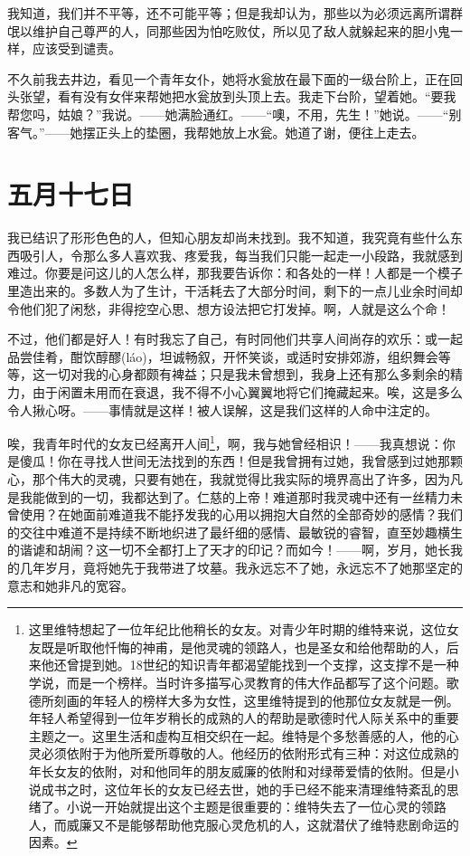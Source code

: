 \documentclass[12pt,oneside]{book}
\begin{document}
我知道，我们并不平等，还不可能平等；但是我却认为，那些以为必须远离所谓群氓以维护自己尊严的人，同那些因为怕吃败仗，所以见了敌人就躲起来的胆小鬼一样，应该受到谴责。

不久前我去井边，看见一个青年女仆，她将水瓮放在最下面的一级台阶上，正在回头张望，看有没有女伴来帮她把水瓮放到头顶上去。我走下台阶，望着她。“要我帮您吗，姑娘？”我说。——她满脸通红。——“噢，不用，先生！”她说。——“别客气。”——她摆正头上的垫圈，我帮她放上水瓮。她道了谢，便往上走去。


\chapter{五月十七日}
我已结识了形形色色的人，但知心朋友却尚未找到。我不知道，我究竟有些什么东西吸引人，令那么多人喜欢我、疼爱我，每当我们只能一起走一小段路，我就感到难过。你要是问这儿的人怎么样，那我要告诉你：和各处的一样！人都是一个模子里造出来的。多数人为了生计，干活耗去了大部分时间，剩下的一点儿业余时间却令他们犯了闲愁，非得挖空心思、想方设法把它打发掉。啊，人就是这么个命！

不过，他们都是好人！有时我忘了自己，有时同他们共享人间尚存的欢乐：或一起品尝佳肴，酣饮醇醪(láo)，坦诚畅叙，开怀笑谈，或适时安排郊游，组织舞会等等，这一切对我的心身都颇有裨益；只是我未曾想到，我身上还有那么多剩余的精力，由于闲置未用而在衰退，我不得不小心翼翼地将它们掩藏起来。唉，这是多么令人揪心呀。——事情就是这样！被人误解，这是我们这样的人命中注定的。

唉，我青年时代的女友已经离开人间\footnote{这里维特想起了一位年纪比他稍长的女友。对青少年时期的维特来说，这位女友既是听取他忏悔的神甫，是他灵魂的领路人，也是圣女和给他帮助的人，后来他还曾提到她。18世纪的知识青年都渴望能找到一个支撑，这支撑不是一种学说，而是一个榜样。当时许多描写心灵教育的伟大作品都写了这个问题。歌德所刻画的年轻人的榜样大多为女性，这里维特提到的他那位女友就是一例。年轻人希望得到一位年岁稍长的成熟的人的帮助是歌德时代人际关系中的重要主题之一。这里生活和虚构互相交织在一起。维特是个多愁善感的人，他的心灵必须依附于为他所爱所尊敬的人。他经历的依附形式有三种：对这位成熟的年长女友的依附，对和他同年的朋友威廉的依附和对绿蒂爱情的依附。但是小说成书之时，这位年长的女友已经去世，她的手已经不能来清理维特紊乱的思绪了。小说一开始就提出这个主题是很重要的：维特失去了一位心灵的领路人，而威廉又不是能够帮助他克服心灵危机的人，这就潜伏了维特悲剧命运的因素。}，啊，我与她曾经相识！——我真想说：你是傻瓜！你在寻找人世间无法找到的东西！但是我曾拥有过她，我曾感到过她那颗心，那个伟大的灵魂，只要有她在，我就觉得比我实际的境界高出了许多，因为凡是我能做到的一切，我都达到了。仁慈的上帝！难道那时我灵魂中还有一丝精力未曾使用？在她面前难道我不能抒发我的心用以拥抱大自然的全部奇妙的感情？我们的交往中难道不是持续不断地织进了最纤细的感情、最敏锐的睿智，直至妙趣横生的谐谑和胡闹？这一切不全都打上了天才的印记？而如今！——啊，岁月，她长我的几年岁月，竟将她先于我带进了坟墓。我永远忘不了她，永远忘不了她那坚定的意志和她非凡的宽容。
\end{document}
